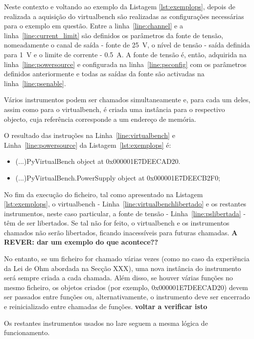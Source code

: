 Neste contexto e voltando ao exemplo da Listagem \ref{lst:exemplops}, depois de realizada a aquisição do \acrshort{virtualbench} são realizadas as configurações necessárias para o exemplo em questão. Entre a linha~\ref{line:channel} e a linha~\ref{line:current_limit} são definidos os parâmetros da fonte de tensão, nomeadamente o canal de saída - fonte de \SI{25}{\volt}, o nível de tensão - saída definida para \SI{1}{\volt} e o limite de corrente - \SI{0.5}{\ampere}. A fonte de tensão é, então, adquirida na linha~\ref{line:powersource} e configurada na linha~\ref{line:psconfig} com os parâmetros definidos anteriormente e todas as saídas da fonte são activadas na linha~\ref{line:psenable}. 

Vários instrumentos podem ser chamados simultaneamente e, para cada um deles, assim como para o \acrshort{virtualbench}, é criada uma instância para o respectivo objecto, cuja referência corresponde a um endereço de memória. 

O resultado das instruções na Linha~\ref{line:virtualbench} e Linha~\ref{line:powersource} da Listagem~\ref{lst:exemplops} é:
\begin{itemize}
	\item (...)PyVirtualBench object at 0x000001E7DEECAD20.
	\item (...)PyVirtualBench.PowerSupply object at 0x000001E7DEECB2F0;
\end{itemize}

No fim da execução do ficheiro, tal como apresentado na Listagem \ref{lst:exemplops}, o \acrshort{virtualbench} - Linha~\ref{line:virtualbenchlibertado} e os restantes instrumentos, neste caso particular, a fonte de tensão - Linha~\ref{line:pslibertada} - têm de ser libertados. Se tal não for feito, o \acrshort{virtualbench} e os instrumentos chamados não serão libertados, ficando inacessíveis para futuras chamadas. \textbf{A REVER: dar um exemplo do que acontece??}

No entanto, se um ficheiro for chamado várias vezes (como no caso da experiência da Lei de Ohm abordada na Secção XXX), uma nova instância do instrumento será sempre criada a cada chamada. Além disso, se houver várias funções no mesmo ficheiro, os objetos criados (por exemplo, 0x000001E7DEECAD20) devem ser passados entre funções ou, alternativamente, o instrumento deve ser encerrado e reinicializado entre chamadas de funções. \textbf{voltar a verificar isto}

Os restantes instrumentos usados no \acrshort{lare}	seguem a mesma lógica de funcionamento.

